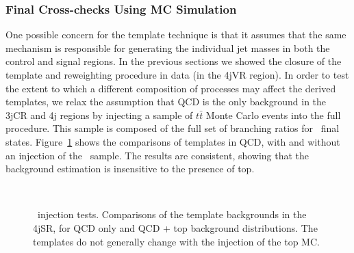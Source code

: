 \subsubsection{Final Cross-checks Using MC Simulation}
\label{chapter:search:search:mc}

One possible concern for the template technique is that it assumes that the same mechanism is responsible for generating the individual jet masses in both the control and signal regions. In the previous sections we showed the closure of the template and reweighting procedure in data (in the 4jVR region). In order to test the extent to which a different composition of processes may affect the derived templates, we relax the assumption that QCD is the only background in the 3jCR and 4j regions by injecting a sample of \Sherpa $t\bar{t}$ Monte Carlo events into the full procedure. This sample is composed of the full set of branching ratios for \ttbar\ final states. Figure~\ref{fig:search:search:mccheck:4jTop} shows the comparisons of templates in \Sherpa QCD, with and without an injection of the \ttbar\ sample. The results are consistent, showing that the background estimation is insensitive to the presence of top.

\begin{figure}[!ht]
  \centering
  
  \\
    
  \caption{\ttbar\ injection tests. Comparisons of the template backgrounds in the 4jSR, for QCD only and QCD + top background distributions. The templates do not generally change with the injection of the top MC.}
               
  \label{fig:search:search:mccheck:4jTop}
\end{figure}



